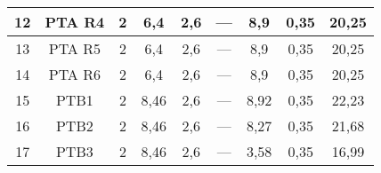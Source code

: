 \begin{table}[h!]
\begin{tabular}{|c|c|c|c|c|c|c|c|c|}
	12                 & PTA R4             & 2                                                    & 6,4                                         & 2,6                                           & ---                                           & 8,9                                              & 0,35                                            & 20,25                                                             \\ \hline
	13                 & PTA R5             & 2                                                    & 6,4                                         & 2,6                                           & ---                                           & 8,9                                              & 0,35                                            & 20,25                                                             \\ \hline
	14                 & PTA R6             & 2                                                    & 6,4                                         & 2,6                                           & ---                                           & 8,9                                              & 0,35                                            & 20,25                                                             \\ \hline
	15                 & PTB1               & 2                                                    & 8,46                                        & 2,6                                           & ---                                           & 8,92                                             & 0,35                                            & 22,23                                                             \\ \hline
	16                 & PTB2               & 2                                                    & 8,46                                        & 2,6                                           & ---                                           & 8,27                                             & 0,35                                            & 21,68                                                             \\ \hline
	17                 & PTB3               & 2                                                    & 8,46                                        & 2,6                                           & ---                                           & 3,58                                             & 0,35                                            & 16,99                                                             \\ \hline

\end{tabular}
\end{table}
